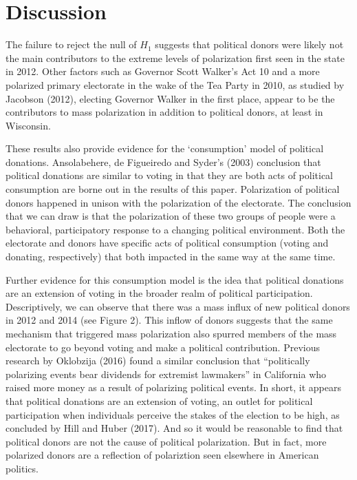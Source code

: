 \documentclass[12pt,]{article}
\begin{document}
\hypertarget{discussion}{%
\section{Discussion}\label{discussion}}

The failure to reject the null of \(H_{1}\) suggests that political
donors were likely not the main contributors to the extreme levels of
polarization first seen in the state in 2012. Other factors such as
Governor Scott Walker's Act 10 and a more polarized primary electorate
in the wake of the Tea Party in 2010, as studied by Jacobson (2012),
electing Governor Walker in the first place, appear to be the
contributors to mass polarization in addition to political donors, at
least in Wisconsin.

These results also provide evidence for the `consumption' model of
political donations. Ansolabehere, de Figueiredo and Syder's (2003)
conclusion that political donations are similar to voting in that they
are both acts of political consumption are borne out in the results of
this paper. Polarization of political donors happened in unison with the
polarization of the electorate. The conclusion that we can draw is that
the polarization of these two groups of people were a behavioral,
participatory response to a changing political environment. Both the
electorate and donors have specific acts of political consumption
(voting and donating, respectively) that both impacted in the same way
at the same time.

Further evidence for this consumption model is the idea that political
donations are an extension of voting in the broader realm of political
participation. Descriptively, we can observe that there was a mass
influx of new political donors in 2012 and 2014 (see Figure 2). This
inflow of donors suggests that the same mechanism that triggered mass
polarization also spurred members of the mass electorate to go beyond
voting and make a political contribution. Previous research by Oklobzija
(2016) found a similar conclusion that ``politically polarizing events
bear dividends for extremist lawmakers'' in California who raised more
money as a result of polarizing political events. In short, it appears
that political donations are an extension of voting, an outlet for
political participation when individuals perceive the stakes of the
election to be high, as concluded by Hill and Huber (2017). And so it
would be reasonable to find that political donors are not the cause of
political polarization. But in fact, more polarized donors are a
reflection of polariztion seen elsewhere in American politics.
\end{document}
